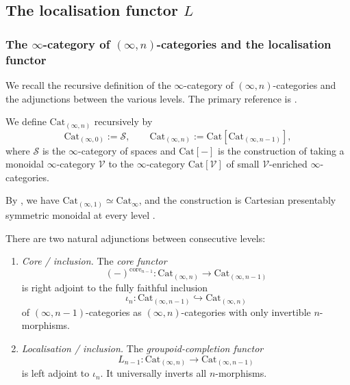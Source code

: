 \documentclass{amsart}
\begin{document}
\subsection{The localisation functor \texorpdfstring{$L$}{L}}\label{sec:localisation-functor}
\subsubsection{The $\infty$-category of $(\infty,n)$-categories and the localisation functor}\label{sec:Cat-infinity-n}

We recall the recursive definition of the $\infty$-category of $(\infty,n)$-categories and the adjunctions between the various levels. The primary reference is \cite{GH19}.

\begin{definition}\label{def:Cat-infinity-n}
We define $\mathrm{Cat}_{(\infty,n)}$ recursively by
\[
\mathrm{Cat}_{(\infty,0)} := \mathcal{S},\qquad \mathrm{Cat}_{(\infty,n)}:=\mathrm{Cat}[\mathrm{Cat}_{(\infty,n-1)}],
\]
where $\mathcal{S}$ is the $\infty$-category of spaces and $\mathrm{Cat}[-]$ is the construction of \cite[\S 5]{GH19}  taking a monoidal $\infty$-category $\mathcal{V}$ to the $\infty$-category $\mathrm{Cat}[\mathcal{V}]$ of small $\mathcal{V}$-enriched $\infty$-categories.
    
\end{definition}

By \cite[Theorem 5.4.6]{GH19}, we have $\mathrm{Cat}_{(\infty,1)} \simeq \mathrm{Cat}_\infty$, and the construction is Cartesian presentably symmetric monoidal at every level \cite[Proposition 5.7.16]{GH19}.

There are two natural adjunctions between consecutive levels:
\begin{enumerate}
\item[$\natural_1$] \textit{Core / inclusion.} The \emph{core functor}
\[
(-)^{\mathrm{core}_{n-1}} \colon \mathrm{Cat}_{(\infty,n)} \to \mathrm{Cat}_{(\infty,n-1)}
\]
is right adjoint to the fully faithful inclusion
\[
\iota_n \colon \mathrm{Cat}_{(\infty,n-1)} \hookrightarrow \mathrm{Cat}_{(\infty,n)}
\]
of $(\infty,n-1)$-categories as $(\infty,n)$-categories with only invertible $n$-morphisms.
\item[$\natural_2$] \textit{Localisation / inclusion.} The \emph{groupoid-completion functor}
\[
L_{n-1} \colon \mathrm{Cat}_{(\infty,n)} \to \mathrm{Cat}_{(\infty,n-1)}
\]
is left adjoint to $\iota_n$. It universally inverts all $n$-morphisms.
\end{enumerate}
\end{document}
